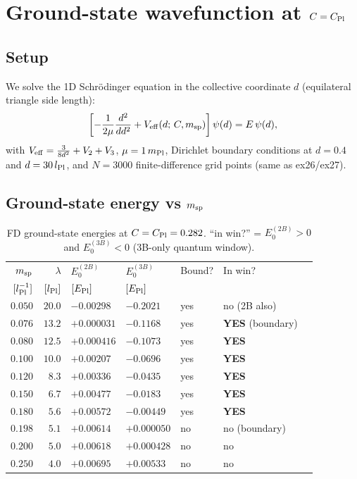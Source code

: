 \section{Ground-state wavefunction at \texorpdfstring{$C=C_{\rm Pl}$}{C=C\_Pl}}
\label{sec:wavefunction}

\subsection{Setup}

We solve the 1D Schr\"odinger equation in the collective coordinate $d$
(equilateral triangle side length):
\begin{equation}
  \left[-\frac{1}{2\mu}\frac{d^2}{dd^2} + V_{\rm eff}(d;\,C,m_{\rm sp})\right]
  \psi(d) = E\,\psi(d),
\end{equation}
with $V_{\rm eff}=\frac{3}{8d^2}+V_2+V_3$, $\mu=1\,m_{\rm Pl}$,
Dirichlet boundary conditions at $d=0.4$ and $d=30\,l_{\rm Pl}$,
and $N=3000$ finite-difference grid points (same as ex26/ex27).

\subsection{Ground-state energy vs \texorpdfstring{$m_{\rm sp}$}{m\_sp}}

\begin{table}[h]
\centering
\caption{FD ground-state energies at $C=C_{\rm Pl}=0.282$.
``in win?'' = $E_0^{(2B)}>0$ and $E_0^{(3B)}<0$ (3B-only quantum window).}
\label{tab:psi0_vs_msp}
\begin{tabular}{rrlllll}
\hline
$m_{\rm sp}$ & $\lambda$ & $E_0^{(2B)}$ & $E_0^{(3B)}$ & Bound? & In win? \\
$[l_{\rm Pl}^{-1}]$ & $[l_{\rm Pl}]$ & $[E_{\rm Pl}]$ & $[E_{\rm Pl}]$ & & \\
\hline
$0.050$ & $20.0$ & $-0.00298$ & $-0.2021$ & yes & no (2B also) \\
$0.076$ & $13.2$ & $+0.000031$ & $-0.1168$ & yes & \textbf{YES} (boundary) \\
$0.080$ & $12.5$ & $+0.000416$ & $-0.1073$ & yes & \textbf{YES} \\
$0.100$ & $10.0$ & $+0.00207$ & $-0.0696$ & yes & \textbf{YES} \\
$0.120$ & $\;\;8.3$ & $+0.00336$ & $-0.0435$ & yes & \textbf{YES} \\
$0.150$ & $\;\;6.7$ & $+0.00477$ & $-0.0183$ & yes & \textbf{YES} \\
$0.180$ & $\;\;5.6$ & $+0.00572$ & $-0.00449$ & yes & \textbf{YES} \\
$0.198$ & $\;\;5.1$ & $+0.00614$ & $+0.000050$ & no & no (boundary) \\
$0.200$ & $\;\;5.0$ & $+0.00618$ & $+0.000428$ & no & no \\
$0.250$ & $\;\;4.0$ & $+0.00695$ & $+0.00533$ & no & no \\
\hline
\end{tabular}
\end{table}

